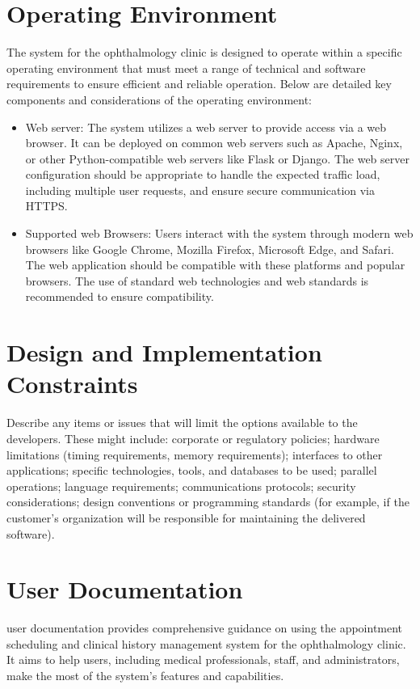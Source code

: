 \documentclass{scrreprt}
\begin{document}
	\section{Operating Environment}
	The system for the ophthalmology clinic is designed to operate within a specific operating environment that must meet a range of technical and software requirements to ensure efficient and reliable operation. Below are detailed key components and considerations of the operating environment:
	\begin{itemize}
		\item Web server: The system utilizes a web server to provide access via a web browser. It can be deployed on common web servers such as Apache, Nginx, or other Python-compatible web servers like Flask or Django. The web server configuration should be appropriate to handle the expected traffic load, including multiple user requests, and ensure secure communication via HTTPS.
		
		\item Supported web Browsers: Users interact with the system through modern web browsers like Google Chrome, Mozilla Firefox, Microsoft Edge, and Safari. The web application should be compatible with these platforms and popular browsers. The use of standard web technologies and web standards is recommended to ensure compatibility.
		
	\end{itemize}
	
	
	\section{Design and Implementation Constraints}
	 Describe any items or issues that will limit the options available to the 
	developers. These might include: corporate or regulatory policies; hardware 
	limitations (timing requirements, memory requirements); interfaces to other 
	applications; specific technologies, tools, and databases to be used; parallel 
	operations; language requirements; communications protocols; security 
	considerations; design conventions or programming standards (for example, if the 
	customer’s organization will be responsible for maintaining the delivered 
	software).
	
	\section{User Documentation}
	 user documentation provides comprehensive guidance on using the appointment scheduling and clinical history management system for the ophthalmology clinic. It aims to help users, including medical professionals, staff, and administrators, make the most of the system's features and capabilities.
	 
\end{document}
